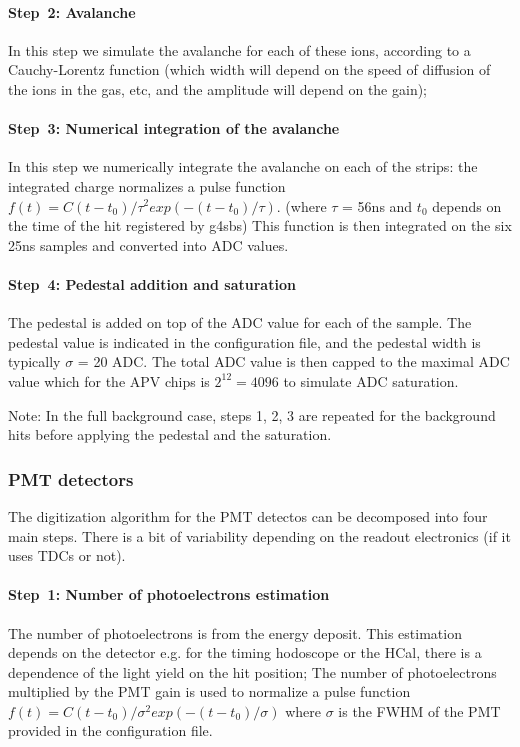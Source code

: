 \paragraph{Step~2: Avalanche}
%
In this step we simulate the avalanche for each of these ions, according to a Cauchy-Lorentz function (which width will depend on the speed of diffusion of the ions in the gas, etc, and the amplitude will depend on the gain);
%
\paragraph{Step~3: Numerical integration of the avalanche}
In this step we numerically integrate the avalanche on each of the strips: the integrated charge normalizes a pulse function $f(t) = C (t-t_0)/\tau^2 exp(-(t-t_0)/\tau)$. (where $\tau$ = 56ns and $t_0$ depends on the time of the hit registered by g4sbs)
This function is then integrated on the six 25ns samples and converted into ADC values.
%
\paragraph{Step~4: Pedestal addition and saturation}
The pedestal is added on top of the ADC value for each of the sample. The pedestal value is indicated in the configuration file, and the pedestal width is typically $\sigma$ = 20 ADC.
The total ADC value is then capped to the maximal ADC value which for the APV chips is $2^{12} = 4096$ to simulate ADC saturation.

Note: In the full background case, steps 1, 2, 3 are repeated for the background hits before applying the pedestal and the saturation.


\subsubsection{PMT detectors}

The digitization algorithm for the PMT detectos can be decomposed into four main steps. There is a bit of variability depending on the readout electronics (if it uses TDCs or not).

\paragraph{Step~1: Number of photoelectrons estimation}
The number of photoelectrons is from the energy deposit. This estimation depends on the detector e.g. for the timing hodoscope or the HCal, there is a dependence of the light yield on the hit position; The number of photoelectrons multiplied by the PMT gain is used to normalize a pulse function  $f(t) = C (t-t_0)/\sigma^2 exp(-(t-t_0)/\sigma)$ where $\sigma$ is the FWHM of the PMT provided in the configuration file.


